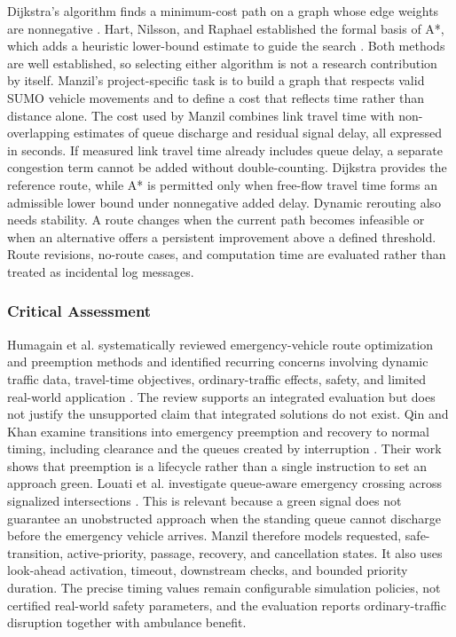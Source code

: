 Dijkstra's algorithm finds a minimum-cost path on a graph whose edge weights are nonnegative \cite{dijkstra1959}. Hart, Nilsson, and Raphael established the formal basis of A*, which adds a heuristic lower-bound estimate to guide the search \cite{hart1968astar}. Both methods are well established, so selecting either algorithm is not a research contribution by itself. Manzil's project-specific task is to build a graph that respects valid SUMO vehicle movements and to define a cost that reflects time rather than distance alone. The cost used by Manzil combines link travel time with non-overlapping estimates of queue discharge and residual signal delay, all expressed in seconds. If measured link travel time already includes queue delay, a separate congestion term cannot be added without double-counting. Dijkstra provides the reference route, while A* is permitted only when free-flow travel time forms an admissible lower bound under nonnegative added delay. Dynamic rerouting also needs stability. A route changes when the current path becomes infeasible or when an alternative offers a persistent improvement above a defined threshold. Route revisions, no-route cases, and computation time are evaluated rather than treated as incidental log messages.

\subsubsection{Critical Assessment}

Humagain et al. systematically reviewed emergency-vehicle route optimization and preemption methods and identified recurring concerns involving dynamic traffic data, travel-time objectives, ordinary-traffic effects, safety, and limited real-world application \cite{humagain2020review}. The review supports an integrated evaluation but does not justify the unsupported claim that integrated solutions do not exist. Qin and Khan examine transitions into emergency preemption and recovery to normal timing, including clearance and the queues created by interruption \cite{qin2012preemption}. Their work shows that preemption is a lifecycle rather than a single instruction to set an approach green. Louati et al. investigate queue-aware emergency crossing across signalized intersections \cite{el2018emergency}. This is relevant because a green signal does not guarantee an unobstructed approach when the standing queue cannot discharge before the emergency vehicle arrives. Manzil therefore models requested, safe-transition, active-priority, passage, recovery, and cancellation states. It also uses look-ahead activation, timeout, downstream checks, and bounded priority duration. The precise timing values remain configurable simulation policies, not certified real-world safety parameters, and the evaluation reports ordinary-traffic disruption together with ambulance benefit.

